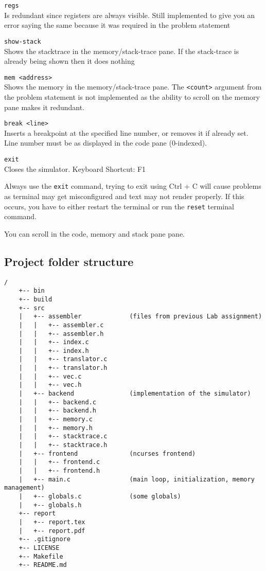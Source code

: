 \documentclass[12pt]{article}
\begin{document}
	\verb|regs|\\
	Is redundant since registers are always visible. Still implemented to give you an error saying the same because it was required in the problem statement

	\verb|show-stack|\\
	Shows the stacktrace in the memory/stack-trace pane. If the stack-trace is already being shown then it does nothing

	\verb|mem <address>|\\
	Shows the memory in the memory/stack-trace pane. The \verb|<count>| argument from the problem statement is not implemented as the ability to scroll on the memory pane makes it redundant.

	\verb|break <line>|\\
	Inserts a breakpoint at the specified line number, or removes it if already set. Line number must be as displayed in the code pane (0-indexed).

	\verb|exit|\\
	Closes the simulator. Keyboard Shortcut: F1
	
	Always use the \verb|exit| command, trying to exit using Ctrl + C will cause problems as terminal may get misconfigured and text may not render properly. If this occurs, you have to either restart the terminal or run the \verb|reset| terminal command.

	You can scroll in the code, memory and stack pane pane.

	\subsection{Project folder structure}
	
	\begin{verbatim}/
	+-- bin
	+-- build
	+-- src
	|   +-- assembler             (files from previous Lab assignment)
	|   |   +-- assembler.c
	|   |   +-- assembler.h
	|   |   +-- index.c
	|   |   +-- index.h
	|   |   +-- translator.c
	|   |   +-- translator.h
	|   |   +-- vec.c
	|   |   +-- vec.h
	|   +-- backend               (implementation of the simulator)
	|   |   +-- backend.c
	|   |   +-- backend.h
	|   |   +-- memory.c
	|   |   +-- memory.h
	|   |   +-- stacktrace.c
	|   |   +-- stacktrace.h
	|   +-- frontend              (ncurses frontend)
	|   |   +-- frontend.c
	|   |   +-- frontend.h
	|   +-- main.c                (main loop, initialization, memory management)
	|   +-- globals.c             (some globals)
	|   +-- globals.h
	+-- report
	|   +-- report.tex
	|   +-- report.pdf
	+-- .gitignore
	+-- LICENSE
	+-- Makefile
	+-- README.md\end{verbatim}
\end{document}
